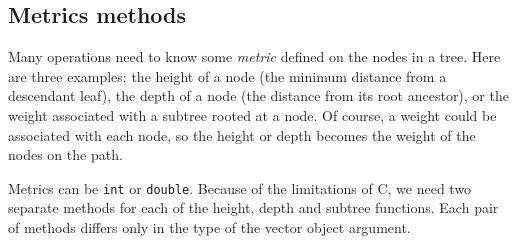 \subsection{Metrics methods}
\label{subsection:Tree:proto:metrics}
\par
Many operations need to know some {\it metric} defined on the nodes
in a tree.
Here are three examples: 
the height of a node (the minimum distance from a descendant leaf),
the depth of a node (the distance from its root ancestor), or
the weight associated with a subtree rooted at a node.
Of course, a weight could be associated with each node, so the
height or depth becomes the weight of the nodes on the path.
\par
Metrics can be {\tt int} or {\tt double}.
Because of the limitations of C, we need two separate methods for
each of the height, depth and subtree functions.
Each pair of methods differs only in the type of the vector object
argument.
\par
